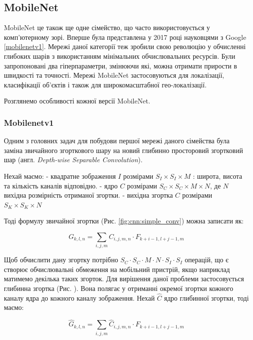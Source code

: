 \subsection{MobileNet}

MobileNet це також ще одне сімейство, що часто використовується у комп'ютерному зорі.
Вперше була представлена у 2017 році науковцями з Google \ref{mobilenetv1}.
Мережі даної категорії теж зробили свою революцію у обчисленні глибоких шарів з
використанням мінімальних обчислювальних ресурсів. Були запропоновані два гіперпараметри,
змінюючи які, можна отримати прирости в швидкості та точності. Мережі MobileNet
застосовуються для локалізації, класифікації об'єктів і також для широкомасштабної
гео-локалізації.

Розглянемо особливості кожної версії MobileNet.

\subsubsection{Mobilenetv1}

Одним з головних задач для побудови першої мережі даного сімейства була заміна
звичайного згорткового шару на новий глибинно просторовий згортковий шар
(англ. \textit{Depth-wise Separable Convolution}).

Нехай маємо:
- квадратне зображення $I$ розмірами $S_I \times S_I \times M$ : широта, висота та
кількість каналів відповідно.
- ядро $C$ розмірами $S_C \times S_C \times M \times N$, де $N$ вихідна розмірність
отриманої згортки.
- вихідна згортка $C$ розмірами $S_K \times S_K \times N$

Тоді формулу звичайної згортки (Рис. \ref{fig:cnn:simple_conv}) можна записати як:

\begin{equation}
    G_{k,l,n} = \sum_{i,j,m} C_{i,j,m,n} · F_{k+i-1, l+j-1,m}
    \label{eq:simple_conv}
\end{equation}

Щоб обчислити дану згортку потрібно $S_C · S_C · M · N · S_I · S_I$ операцій, що
є створює обчислювальні обмеження на мобільний пристрій, якщо наприклад матимемо
декілька таких згорток.
Для вирішення даної проблеми застосовується глибинна згортка (Рис. ). Вона полягає
у отриманні окремої згортки кожного каналу ядра до кожного каналу
зображення.
Нехай $\widehat{C}$ ядро глибинної згортки, тоді маємо:

\begin{equation}
    \widehat{G}_{k,l,n} = \sum_{i,j,m} \widehat{C}_{i,j,m,n} · F_{k+i-1, l+j-1,m}
    \label{eq:deep_wise_conv}
\end{equation}

